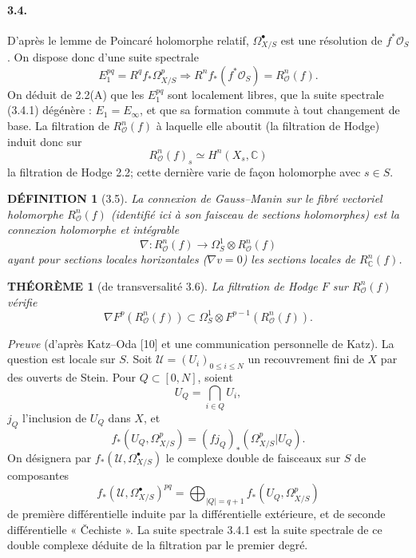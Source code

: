\documentclass[10pt]{article}
\newcommand{\C}{\mathbb C}
\newcommand{\cO}{\mathcal O}
\newcommand{\cU}{\mathcal U}
\theoremstyle{deligne}
\newtheorem*{definition}{DÉFINITION}
\newtheorem*{theoreme}{THÉORÈME}
\begin{document}
\paragraph{3.4.}
D'après le lemme de Poincaré holomorphe relatif, $\Omega_{X/S}^\bullet$ est une résolution de $f^*\cO_S$. On dispose donc d'une suite spectrale
\begin{equation}
E_1^{pq}=R^qf_*\Omega^p_{X/S}\Rightarrow R^n f_*(f^*\cO_S)=R_\cO^n(f).
\tag{3.4.1}
\end{equation}
On déduit de 2.2(A) que les $E_1^{pq}$ sont localement libres, que la suite spectrale (3.4.1) dégénère : $E_1=E_\infty$, et que sa formation commute à tout changement de base. La filtration de $R_\cO^n(f)$ à laquelle elle aboutit (la filtration de Hodge) induit donc sur
\[
R_\cO^n(f)_s\simeq H^n(X_s,\C)
\]
la filtration de Hodge 2.2; cette dernière varie de façon holomorphe avec $s\in S$.

\begin{definition}[3.5]
La connexion de Gauss--Manin sur le fibré vectoriel holomorphe $R_\cO^n(f)$ (identifié ici à son faisceau de sections holomorphes) est la connexion holomorphe et intégrable
\[
\nabla:R_\cO^n(f)\longrightarrow\Omega_S^1\otimes R_\cO^n(f)
\]
ayant pour sections locales horizontales ($\nabla v=0$) les sections locales de $R_\C^n(f)$.
\end{definition}

\begin{theoreme}[de transversalité 3.6]
La filtration de Hodge $F$ sur $R_\cO^n(f)$ vérifie
\[
\nabla F^p(R_\cO^n(f))\subset \Omega_S^1\otimes F^{p-1}(R_\cO^n(f)).
\]
\end{theoreme}

\emph{Preuve} (d'après Katz--Oda [10] et une communication personnelle de Katz). La question est locale sur $S$. Soit $\cU=(U_i)_{0\le i\le N}$ un recouvrement fini de $X$ par des ouverts de Stein. Pour $Q\subset[0,N]$, soient
\[
U_Q=\bigcap_{i\in Q}U_i,
\]
$j_Q$ l'inclusion de $U_Q$ dans $X$, et
\[
f_*(U_Q,\Omega^p_{X/S})=(fj_Q)_*(\Omega^p_{X/S}|U_Q).
\]
On désignera par $f_*(\cU,\Omega^\bullet_{X/S})$ le complexe double de faisceaux sur $S$ de composantes
\begin{equation}
f_*(\cU,\Omega^\bullet_{X/S})^{pq}=\bigoplus_{|Q|=q+1} f_*(U_Q,\Omega^p_{X/S})
\tag{3.6.1}
\end{equation}
de première différentielle induite par la différentielle extérieure, et de seconde différentielle « Čechiste ». La suite spectrale 3.4.1 est la suite spectrale de ce double complexe déduite de la filtration par le premier degré.
\end{document}
